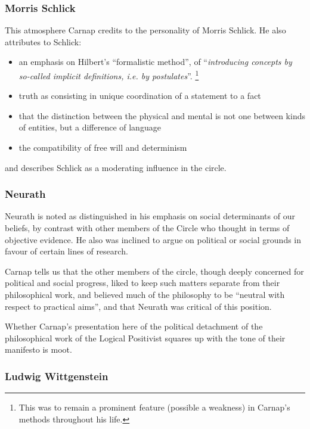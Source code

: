 \documentclass[10pt,titlepage]{book}
\begin{document}
\subsubsection{Morris Schlick}

This atmosphere Carnap credits to the personality of Morris Schlick.
He also attributes to Schlick:
\begin{itemize}
\item an emphasis on Hilbert's ``formalistic method'', of ``\emph{introducing concepts by so-called implicit definitions, i.e. by postulates}''.
\footnote{This was to remain a prominent feature (possible a weakness) in Carnap's methods throughout his life.}

\item truth as consisting in unique coordination of a statement to a fact

\item that the distinction between the physical and mental is not one between kinds of entities, but a difference of language

\item the compatibility of free will and determinism

\end{itemize}

and describes Schlick as a moderating influence in the circle.

\subsubsection{Neurath}

Neurath is noted as distinguished in his emphasis on social determinants of our beliefs, by contrast with other members of the Circle who thought in terms of objective evidence.
He also was inclined to argue on political or social grounds in favour of certain lines of research.

Carnap tells us that the other members of the circle, though deeply concerned for political and social progress, liked to keep such matters separate from their philosophical work, and believed much of the philosophy to be ``neutral with respect to practical aims'', and that Neurath was critical of this position.

Whether Carnap's presentation here of the political detachment of the philosophical work of the Logical Positivist squares up with the tone of their manifesto is moot. 

\subsubsection{Ludwig Wittgenstein}
\end{document}
